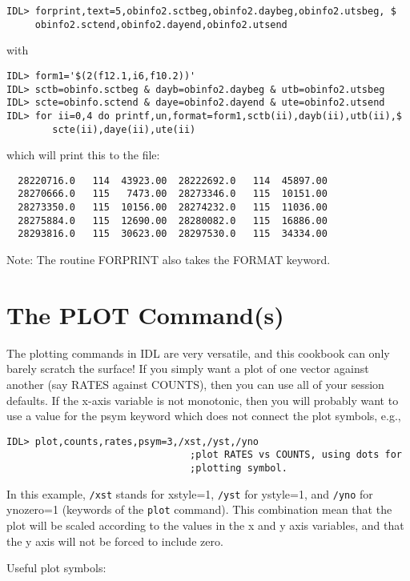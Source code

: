 \medskip\noindent
\begin{verbatim}
IDL> forprint,text=5,obinfo2.sctbeg,obinfo2.daybeg,obinfo2.utsbeg, $
     obinfo2.sctend,obinfo2.dayend,obinfo2.utsend
\end{verbatim}
with

\medskip\noindent
\begin{verbatim}
IDL> form1='$(2(f12.1,i6,f10.2))'
IDL> sctb=obinfo.sctbeg & dayb=obinfo2.daybeg & utb=obinfo2.utsbeg
IDL> scte=obinfo.sctend & daye=obinfo2.dayend & ute=obinfo2.utsend
IDL> for ii=0,4 do printf,un,format=form1,sctb(ii),dayb(ii),utb(ii),$
        scte(ii),daye(ii),ute(ii)
\end{verbatim}
which will print this to the file:

\medskip\noindent
\begin{verbatim}
  28220716.0   114  43923.00  28222692.0   114  45897.00
  28270666.0   115   7473.00  28273346.0   115  10151.00
  28273350.0   115  10156.00  28274232.0   115  11036.00
  28275884.0   115  12690.00  28280082.0   115  16886.00
  28293816.0   115  30623.00  28297530.0   115  34334.00
\end{verbatim}
Note: The routine FORPRINT also takes the FORMAT keyword.
 

\section{The PLOT Command(s)}
 
The plotting commands in IDL are very versatile, and this cookbook can only
barely scratch the surface! If you simply want a plot of one vector against
another (say RATES against COUNTS), then you can use all of your session
defaults. If the x-axis variable is not monotonic, then you will probably want
to use a value for the psym keyword which does not connect the plot symbols,
e.g.,

\medskip\noindent
\begin{verbatim}
IDL> plot,counts,rates,psym=3,/xst,/yst,/yno
                                ;plot RATES vs COUNTS, using dots for
                                ;plotting symbol.
\end{verbatim}
In this example, {\tt /xst} stands for xstyle=1, {\tt /yst} for ystyle=1, and {\tt /yno}
for ynozero=1 (keywords of the {\tt plot} command). This combination mean that the
plot will be scaled according to the values in the x and y axis variables, and
that the y axis will not be forced to include zero.
 
Useful plot symbols:	

